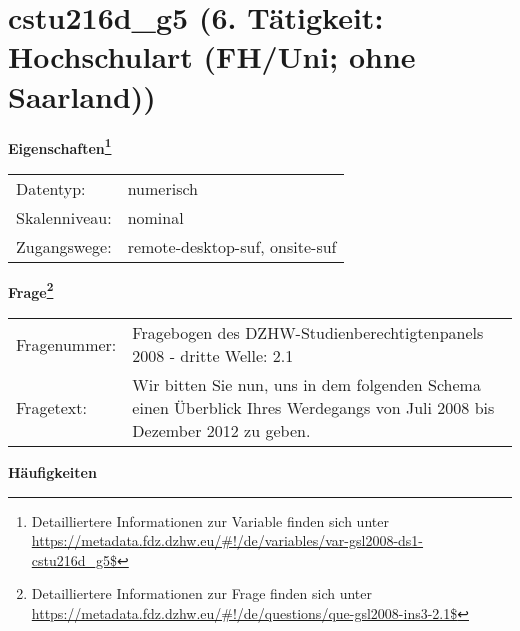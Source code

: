 
    \setcounter{footnote}{0}

    \vspace*{-1.8cm}
	\section{cstu216d\_g5 (6. Tätigkeit: Hochschulart (FH/Uni; ohne Saarland))}
	\label{section:cstu216d_g5}



    \vspace*{0.5cm}
    \noindent\textbf{Eigenschaften\footnote{Detailliertere Informationen zur Variable finden sich unter
		\url{https://metadata.fdz.dzhw.eu/\#!/de/variables/var-gsl2008-ds1-cstu216d_g5$}}}\\
	\begin{tabularx}{\hsize}{@{}lX}
	Datentyp: & numerisch \\
	Skalenniveau: & nominal \\
	Zugangswege: &
	  remote-desktop-suf, 
	  onsite-suf
 \\
    \end{tabularx}



				\vspace*{0.5cm}
                \noindent\textbf{Frage\footnote{Detailliertere Informationen zur Frage finden sich unter
		              \url{https://metadata.fdz.dzhw.eu/\#!/de/questions/que-gsl2008-ins3-2.1$}}}\\
				\begin{tabularx}{\hsize}{@{}lX}
					Fragenummer: &
					  Fragebogen des DZHW-Studienberechtigtenpanels 2008 - dritte Welle:
					  2.1
 \\
					Fragetext: & Wir bitten Sie nun, uns in dem folgenden Schema einen Überblick Ihres Werdegangs von Juli 2008 bis Dezember 2012 zu geben. \\
				\end{tabularx}





        		\vspace*{0.5cm}
                \noindent\textbf{Häufigkeiten}


